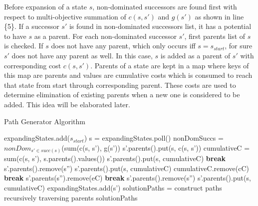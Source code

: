 Before expansion of a state $s$, non-dominated successors are found first with respect to multi-objective summation of $c(s,s')$ and $g(s')$ as shown in line \{5\}. If a successor $s'$ is found in non-dominated successors list, it has a potential to have $s$ as a parent. For each non-dominated successor $s'$, first parents list of $s$ is checked. If $s$ does not have any parent, which only occurs iff $s=s_{start}$, for sure $s'$ does not have any parent as well. In this case, $s$ is added  as a parent of $s'$ with corresponding cost $c(s,s')$. Parents of a state are kept in a map where keys of this map are parents and values are cumulative costs which is consumed to reach that state from start through corresponding parent. These costs are used to determine elimination of existing parents when a new one is considered to be added. This idea will be elaborated later.

\begin{algorithm}
	\caption{Path Generator Algorithm}
	\label{algPathGen}
    \begin{algorithmic}[1]
			\State expandingStates.add($s_{start}$)
    				\State s = expandingStates.poll()
				\State nonDomSuccs = $nonDom_{s' \in succ(s)}$(sum(c(s, s'), g(s'))
    						\State s'.parents().put(s, c(s, s'))
    					\Else
    						\State cumulativeC = sum(c(s, s'), s.parents().values())
    							\State s'.parents().put(s, cumulativeC)
    						\Else
									\State \textbf{break}
									\State s'.parents().remove(s'')
									\State s'.parents().put(s, cumulativeC)
								\Else
												\State cumulativeC.remove(cC) 
												\State \textbf{break}
												\State s'.parents(s'').remove(eC) 
												\State \textbf{break}
											\EndIf
										\EndFor
											\State s'.parents().remove(s'')
										\EndIf
									\EndFor
											\State s'.parents().put(s, cumulativeC)
									\EndIf
								\EndIf
							\EndFor    						
    						\EndIf
    					\EndIf
    						\State expandingStates.add(s')
    					\EndIf
    				\EndFor
    			\EndWhile
    			\State solutionPaths = construct paths recursively traversing parents
    			\State \Return solutionPaths
    		\EndFunction
	\end{algorithmic}
\end{algorithm}

